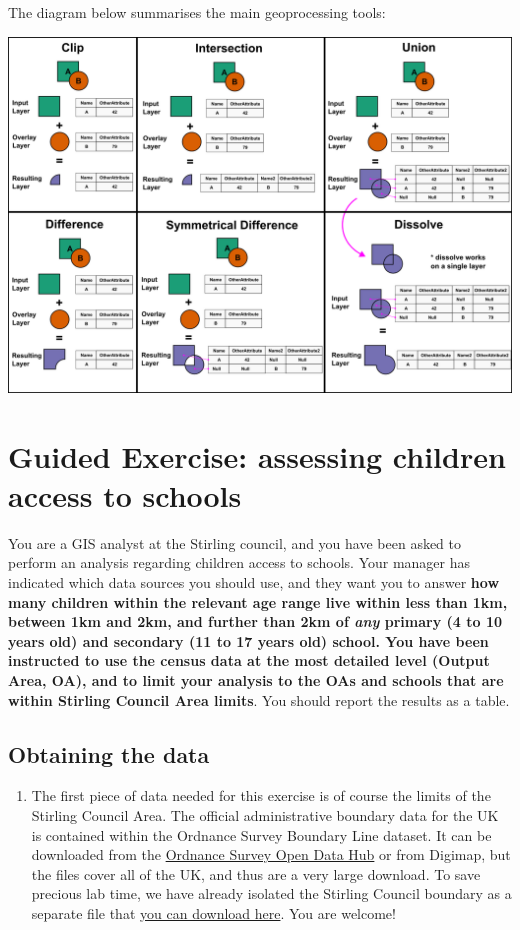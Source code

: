 \documentclass[
  letterpaper,
  DIV=11,
  numbers=noendperiod]{scrreprt}
\providecommand{\tightlist}{%
  \setlength{\itemsep}{0pt}\setlength{\parskip}{0pt}}\usepackage{longtable,booktabs,array}
\begin{document}
The diagram below summarises the main geoprocessing tools:

\includegraphics{images/lab_11/lab11_fig1_Geoprocessing.png}

\section{Guided Exercise: assessing children access to
schools}\label{guided-exercise-assessing-children-access-to-schools}

You are a GIS analyst at the Stirling council, and you have been asked
to perform an analysis regarding children access to schools. Your
manager has indicated which data sources you should use, and they want
you to answer \textbf{how many children within the relevant age range
live within less than 1km, between 1km and 2km, and further than 2km of
\emph{any} primary (4 to 10 years old) and secondary (11 to 17 years
old) school. You have been instructed to use the census data at the most
detailed level (Output Area, OA), and to limit your analysis to the OAs
and schools that are within Stirling Council Area limits}. You should
report the results as a table.

\subsection{Obtaining the data}\label{obtaining-the-data}

\begin{enumerate}
\def\labelenumi{(\arabic{enumi})}
\setcounter{enumi}{277}
\tightlist
\item
  The first piece of data needed for this exercise is of course the
  limits of the Stirling Council Area. The official administrative
  boundary data for the UK is contained within the Ordnance Survey
  Boundary Line dataset. It can be downloaded from the
  \href{https://osdatahub.os.uk/}{Ordnance Survey Open Data Hub} or from
  Digimap, but the files cover all of the UK, and thus are a very large
  download. To save precious lab time, we have already isolated the
  Stirling Council boundary as a separate file that
  \href{https://stir-my.sharepoint.com/:u:/g/personal/ala2_stir_ac_uk/Ec19oxQIg-VHi8eiL6A4oFoBishvQS4SutpZ_JVjsZCUcQ?e=coeiWr}{you
  can download here}. You are welcome!
\end{enumerate}
\end{document}
